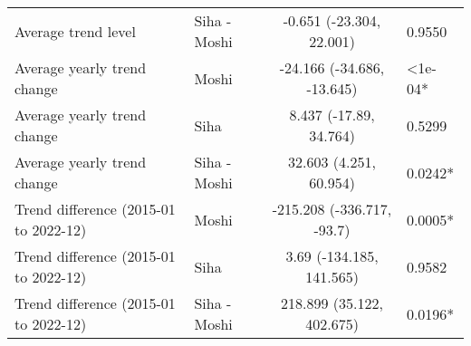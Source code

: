 \begin{longtable}{l|lcl}
Average trend level & Siha - Moshi & -0.651 (-23.304, 22.001) & 0.9550 \\ 
Average yearly trend change & Moshi & -24.166 (-34.686, -13.645) & <1e-04* \\ 
Average yearly trend change & Siha & 8.437 (-17.89, 34.764) & 0.5299 \\ 
Average yearly trend change & Siha - Moshi & 32.603 (4.251, 60.954) & 0.0242* \\ 
Trend difference (2015-01 to 2022-12) & Moshi & -215.208 (-336.717, -93.7) & 0.0005* \\ 
Trend difference (2015-01 to 2022-12) & Siha & 3.69 (-134.185, 141.565) & 0.9582 \\ 
Trend difference (2015-01 to 2022-12) & Siha - Moshi & 218.899 (35.122, 402.675) & 0.0196* \\ 
\bottomrule
\end{longtable}
\endgroup

